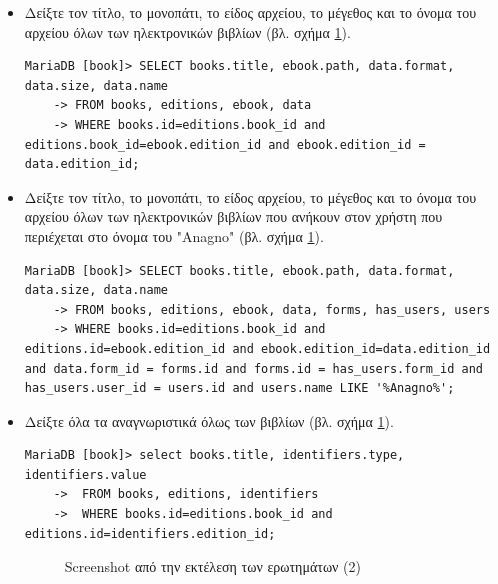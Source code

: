 \documentclass{assignment}
\begin{document}
\begin{itemize}
\item Δείξτε τον τίτλο, το μονοπάτι, το είδος αρχείου, το μέγεθος και το όνομα του αρχείου όλων των ηλεκτρονικών βιβλίων (βλ. σχήμα \ref{fig:queries_2}).
\begin{verbatim}
MariaDB [book]> SELECT books.title, ebook.path, data.format, data.size, data.name 
    -> FROM books, editions, ebook, data 
    -> WHERE books.id=editions.book_id and editions.book_id=ebook.edition_id and ebook.edition_id = data.edition_id;
\end{verbatim}

\item Δείξτε τον τίτλο, το μονοπάτι, το είδος αρχείου, το μέγεθος και το όνομα του αρχείου όλων των ηλεκτρονικών βιβλίων που ανήκουν στον χρήστη που περιέχεται στο όνομα του "Anagno" (βλ. σχήμα \ref{fig:queries_2}).
\begin{verbatim}
MariaDB [book]> SELECT books.title, ebook.path, data.format, data.size, data.name 
    -> FROM books, editions, ebook, data, forms, has_users, users 
    -> WHERE books.id=editions.book_id and editions.id=ebook.edition_id and ebook.edition_id=data.edition_id and data.form_id = forms.id and forms.id = has_users.form_id and has_users.user_id = users.id and users.name LIKE '%Anagno%';
\end{verbatim}

\item Δείξτε όλα τα αναγνωριστικά όλως των βιβλίων (βλ. σχήμα \ref{fig:queries_2}).
\begin{verbatim}
MariaDB [book]> select books.title, identifiers.type, identifiers.value 
    ->  FROM books, editions, identifiers 
    ->  WHERE books.id=editions.book_id and editions.id=identifiers.edition_id;
\end{verbatim}

\begin{figure}
\begin{center}
\caption{Screenshot από την εκτέλεση των ερωτημάτων (2)}
\label{fig:queries_2}
\end{center}
\end{figure}


\end{itemize}
\end{document}
